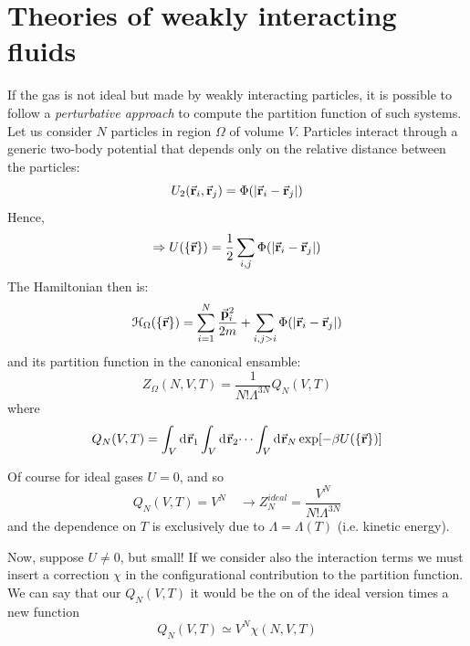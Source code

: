 \documentclass[../../Main/Main.tex]{subfiles}
\begin{document}
\section{Theories of weakly interacting fluids}
If the gas is not ideal but made by weakly interacting particles, it is possible to follow a \emph{perturbative approach}  to compute the partition function of such systems. Let us consider \( N \) particles in region \( \Omega  \) of volume \( V \). Particles interact through a generic two-body potential that depends only on the relative distance between the particles:
\begin{equation*}
  U_2 ( \va{r}_i, \va{r}_j) = \Phi (\abs{\va{r}_i - \va{r}_j} )
\end{equation*}
Hence,
\begin{equation}
  \Rightarrow U ( \{ \va{r} \}  ) = \frac{1}{2} \sum_{i,j}^{} \Phi (\abs{\va{r}_i - \va{r}_j} )
\end{equation}
The Hamiltonian then is:
\begin{equation}
  \mathcal{H}_ \Omega (\{ \va{r} \}  ) = \sum_{i=1}^{N} \frac{\va{p}_i^2}{2m} + \sum_{i,j>i}^{} \Phi (\abs{\va{r}_i - \va{r}_j} )
\end{equation}
and its partition function in the canonical ensamble:
\begin{equation}
  Z_ \Omega (N,V,T) = \frac{1}{N! \Lambda ^{3N}} Q_N (V,T)
\end{equation}
where
\begin{equation}
  Q_N (V,T) = \int_{V}^{} \dd[]{\va{r}_1} \int_{V}^{} \dd[]{\va{r}_2} \dots \int_{V}^{} \dd[]{\va{r}_N} \exp [- \beta U (\{ \va{r} \}  )]
\end{equation}
\begin{remark}
Of course for ideal gases \( U = 0 \), and so
\begin{equation*}
  Q_N (V,T) = V^N \quad \rightarrow Z_N^{ideal} = \frac{V^N}{N! \Lambda ^{3N}}
\end{equation*}
and the dependence on \( T \) is exclusively due to \( \Lambda = \Lambda (T) \) (i.e. kinetic energy).
\end{remark}
Now, suppose \( U \neq 0 \), but small!
If we consider also the interaction terms we must insert a correction \( \chi  \) in the configurational contribution to the partition function.
 We can say that our \( Q_N (V,T) \) it would be the on of the ideal version times a new function
\begin{equation}
 Q_N (V,T) \simeq V^N \chi (N,V,T)
\end{equation}
\end{document}
